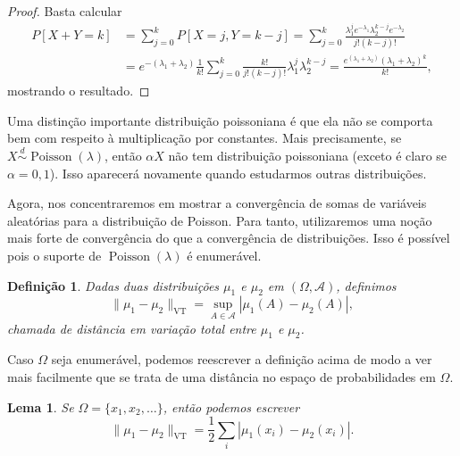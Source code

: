 \documentclass[reqno, draft]{book}
\newcommand*\1{\mathds{1}}
\newtheorem{lemma}[theorem]{Lema}
\newtheorem{definition}[theorem]{Definição}
\DeclareMathOperator{\Poisson}{Poisson}
\DeclareMathOperator{\VT}{VT}
\begin{document}
\begin{proof}
Basta calcular
\begin{equation}
  \begin{split}
    P[X+Y = k] & = \sum_{j = 0}^k P[X = j, Y = k-j] = \sum_{j = 0}^k \frac{\lambda_1^j e^{-\lambda_1} \lambda_2^{k-j} e^{-\lambda_2}}{j! (k-j)!}\\
    & = e^{-(\lambda_1 + \lambda_2)} \frac{1}{k!} \sum_{j = 0}^k \frac{k!}{j! (k-j)!} \lambda_1^j \lambda_2^{k-j} = \frac{e^{(\lambda_1 + \lambda_2)} (\lambda_1 + \lambda_2)^k}{k!},
  \end{split}
\end{equation}
mostrando o resultado.
\end{proof}

Uma distinção importante distribuição poissoniana é que ela não se comporta bem com respeito à multiplicação por constantes. Mais precisamente, se $X \overset{d}\sim \Poisson(\lambda)$, então $\alpha X$ não tem distribuição poissoniana (exceto é claro se $\alpha = 0, 1$).
Isso aparecerá novamente quando estudarmos outras distribuições.

Agora, nos concentraremos em mostrar a convergência de somas de variáveis aleatórias para a distribuição de Poisson. Para tanto, utilizaremos uma noção mais forte de convergência do que a convergência de distribuições. Isso é possível pois o suporte de $\Poisson(\lambda)$ é enumerável.

\begin{definition}
Dadas duas distribuições $\mu_1$ e $\mu_2$ em $(\Omega, \mathcal{A})$, definimos
\begin{equation}
  \lVert \mu_1 - \mu_2 \rVert_{\VT} = \sup_{A \in \mathcal{A}} |\mu_1(A) - \mu_2(A)|,
\end{equation}
 chamada de distância em variação total  entre $\mu_1$ e $\mu_2$.
\end{definition}

Caso $\Omega$ seja enumerável, podemos reescrever a definição acima de modo a ver mais facilmente que se trata de uma distância no espaço de probabilidades em $\Omega$.

\begin{lemma}
\label{l:vt_l1}
Se $\Omega = \{x_1, x_2, \dots\}$, então podemos escrever
\begin{equation}
  \lVert \mu_1 - \mu_2 \rVert_{\VT} = \frac{1}{2} \sum_{i} |\mu_1(x_i) - \mu_2(x_i)|.
\end{equation}
\end{lemma}
\end{document}
